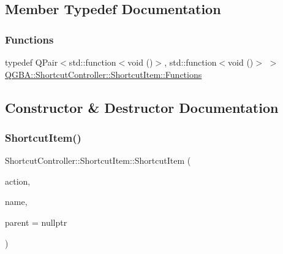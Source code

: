 \subsection{Member Typedef Documentation}
\mbox{\label{class_q_g_b_a_1_1_shortcut_controller_1_1_shortcut_item_a28ffcf4fe5bf253d0d47e2357794ddf1}} 
\subsubsection{\texorpdfstring{Functions}{Functions}}
{\footnotesize\ttfamily typedef Q\+Pair$<$std\+::function$<$void ()$>$, std\+::function$<$void ()$>$ $>$ \mbox{\hyperlink{class_q_g_b_a_1_1_shortcut_controller_1_1_shortcut_item_a28ffcf4fe5bf253d0d47e2357794ddf1}{Q\+G\+B\+A\+::\+Shortcut\+Controller\+::\+Shortcut\+Item\+::\+Functions}}}



\subsection{Constructor \& Destructor Documentation}
\mbox{\label{class_q_g_b_a_1_1_shortcut_controller_1_1_shortcut_item_ae467c23c5169505c1c202879fef70aa4}} 
\subsubsection{\texorpdfstring{Shortcut\+Item()}{ShortcutItem()}\hspace{0.1cm}{\footnotesize\ttfamily [1/3]}}
{\footnotesize\ttfamily Shortcut\+Controller\+::\+Shortcut\+Item\+::\+Shortcut\+Item (\begin{DoxyParamCaption}\item[{Q\+Action $\ast$}]{action,  }\item[{const Q\+String \&}]{name,  }\item[{\mbox{\hyperlink{class_q_g_b_a_1_1_shortcut_controller_1_1_shortcut_item}{Shortcut\+Item}} $\ast$}]{parent = {\ttfamily nullptr} }\end{DoxyParamCaption})}

